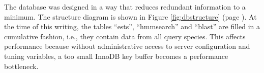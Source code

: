 The database was designed in a way that reduces redundant information to a
minimum. The structure diagram is shown in Figure \ref{fig:dbstructure} (page
\pageref{fig:dbstructure}). At the time of this writing, the tables ``ests'',
``hmmsearch'' and ``blast'' are filled in a cumulative fashion, i.e., they
contain data from all query species. This affects performance because without
administrative access to server configuration and tuning variables, a too small
InnoDB key buffer becomes a performance bottleneck. 

%


